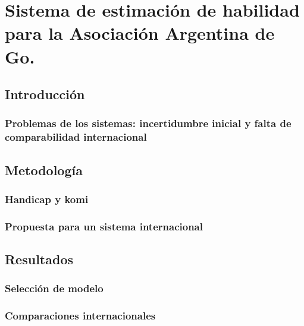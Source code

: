 \documentclass[a4paper,10pt]{book}
\theoremstyle{definition}
\begin{document}
\chapter{Sistema de estimación de habilidad para la Asociación Argentina de Go.} \label{ch:aago}

\section{Introducción}

\subsection{Problemas de los sistemas: incertidumbre inicial y falta de comparabilidad internacional}

\section{Metodología}

\subsection{Handicap y komi}

\subsection{Propuesta para un sistema internacional}

\section{Resultados}

\subsection{Selección de modelo}

\subsection{Comparaciones internacionales}

\newpage

{\footnotesize




}
\end{document}
